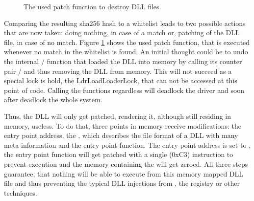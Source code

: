 \begin{figure}[tbph]
\inputminted[breakanywhere, breaklines,fontsize=\scriptsize, frame=single, mathescape, linenos, numbersep=5pt, numbersep=5pt, xleftmargin=0pt]{c}{sections/implementation/code6.c}
\caption{The used patch function to destroy DLL files.}
\label{code:code6}
\end{figure}
Comparing the resulting sha256 hash to a whitelist leads to two possible actions that are now taken: doing nothing, in case of a match or, patching of the \gls{DLL} file, in case of no match. Figure \ref{code:code6} shows the used patch function, that is executed whenever no match in the whitelist is found.
An initial thought could be to undo the internal / function that loaded the \gls{DLL} into memory by calling its counter pair / and thus removing the \gls{DLL} from memory. This will not succeed as a special lock is hold, the LdrLoadLoaderLock, that can not be accessed at this point of code. Calling the functions regardless will deadlock the driver and soon after deadlock the whole system. 

\medskip

Thus, the \gls{DLL} will only get patched, rendering it, although still residing in memory, useless. To do that, three points in memory receive modifications: the entry point address, the , which describes the file format of a \gls{DLL} with many meta information and the entry point function. The entry point address is set to , the entry point function will get patched with a single  (0xC3) instruction to prevent execution and the memory containing the  will get zeroed. All three steps guarantee, that nothing will be able to execute from this memory mapped \gls{DLL} file and thus preventing the typical \gls{DLL} injections from , the registry or other techniques.

